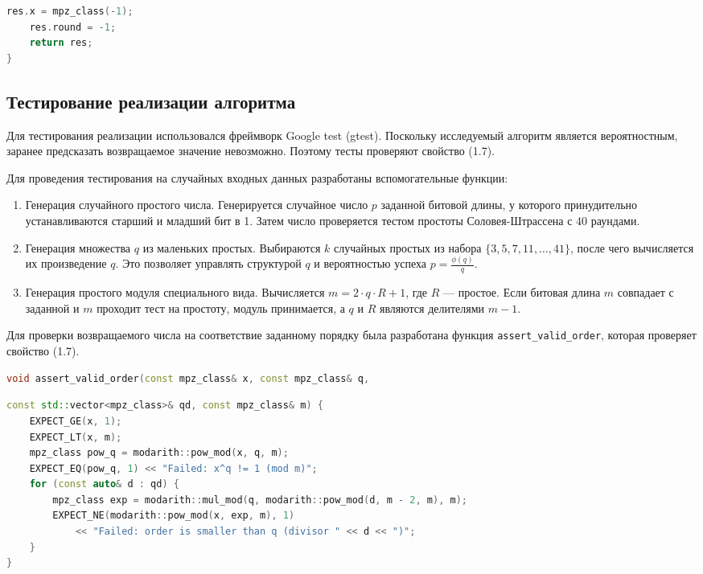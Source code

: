 \documentclass[14pt,a4paper]{extarticle}
\begin{document}
\begin{spacing}{1.5}
\begin{lstlisting}[language=C++]
    res.x = mpz_class(-1);
    res.round = -1;
    return res;
}
\end{lstlisting}

\subsection{Тестирование реализации алгоритма}
Для тестирования реализации использовался фреймворк Google test (gtest). Поскольку исследуемый алгоритм является вероятностным, заранее предсказать возвращаемое значение невозможно. Поэтому тесты проверяют свойство (1.7).

Для проведения тестирования на случайных входных данных разработаны вспомогательные функции:
\begin{enumerate}
    \item Генерация случайного простого числа. Генерируется случайное число \(p\) заданной битовой длины, у которого принудительно устанавливаются старший и младший бит в 1. Затем число проверяется тестом простоты Соловея-Штрассена с 40 раундами.
    \item Генерация множества \(q\) из маленьких простых. Выбираются \(k\) случайных простых из набора \(\{3, 5, 7, 11, \dots, 41\}\), после чего вычисляется их произведение \(q\). Это позволяет управлять структурой \(q\) и вероятностью успеха \(p = \frac{\phi(q)}{q}\).
    \item Генерация простого модуля специального вида. Вычисляется \(m = 2 \cdot q \cdot R + 1\), где \(R\) — простое. Если битовая длина \(m\) совпадает с заданной и \(m\) проходит тест на простоту, модуль принимается, а \(q\) и \(R\) являются делителями \(m - 1\).
\end{enumerate}

Для проверки возвращаемого числа на соответствие заданному порядку была разработана функция \texttt{assert\_valid\_order}, которая проверяет свойство (1.7).
\begin{lstlisting}[language=C++]
void assert_valid_order(const mpz_class& x, const mpz_class& q,
\end{lstlisting}

\begin{lstlisting}[language=C++]
const std::vector<mpz_class>& qd, const mpz_class& m) {
    EXPECT_GE(x, 1);
    EXPECT_LT(x, m);
    mpz_class pow_q = modarith::pow_mod(x, q, m);
    EXPECT_EQ(pow_q, 1) << "Failed: x^q != 1 (mod m)";
    for (const auto& d : qd) {
        mpz_class exp = modarith::mul_mod(q, modarith::pow_mod(d, m - 2, m), m);
        EXPECT_NE(modarith::pow_mod(x, exp, m), 1)
            << "Failed: order is smaller than q (divisor " << d << ")";
    }
}
\end{lstlisting}


\end{spacing}
\end{document}
